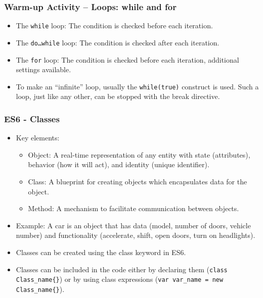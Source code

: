 \documentclass[screen, aspectratio=43]{beamer}
\begin{document}
%
\begin{frame}
\frametitle{Warm-up Activity -- Loops: while and for}
\begin{itemize}
\item The \texttt{while} loop: The condition is checked before each iteration.
\item The \texttt{do…while} loop: The condition is checked after each iteration.
\item The \texttt{for} loop: The condition is checked before each iteration, additional settings available.
\item To make an “infinite” loop, usually the \texttt{while(true)} construct is used. Such a loop, just like any other, can be stopped with the break directive.
\end{itemize}
\vspace{10 mm}
\end{frame}
%
\begin{frame}
\frametitle{ES6 - Classes}
\begin{itemize}
\item Key elements:
\begin{itemize}
\item Object: A real-time representation of any entity with state (attributes), behavior (how it will act), and identity (unique identifier).
\item Class: A blueprint for creating objects which encapsulates data for the object.
\item Method: A mechanism to facilitate communication between objects.
\end{itemize}
\item Example: A car is an object that has data (model, number of doors, vehicle number) and functionality (accelerate, shift, open doors, turn on headlights).
\item Classes can be created using the class keyword in ES6.
\item Classes can be included in the code either by declaring them (\texttt{class Class\_name\{\}}) or by using class expressions (\texttt{var var\_name = new Class\_name\{\}}).
\end{itemize}
\vspace{2 mm}
\end{frame}
\end{document}
